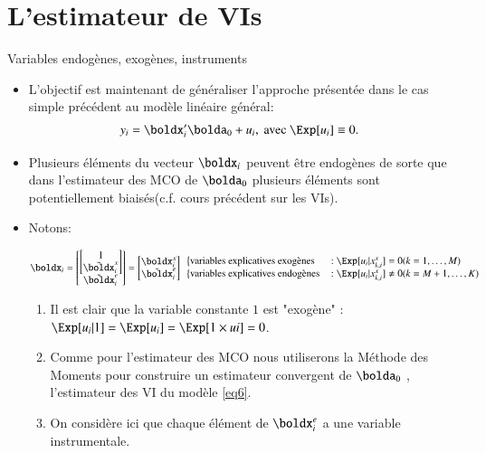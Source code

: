\section{L'estimateur de VIs}
\frame{\sectionpage}
\begin{frame}[allowframebreaks]{Variables endogènes, exogènes, instruments}
\begin{itemize}
    \item L’objectif est maintenant de généraliser l’approche présentée dans
     le cas simple précédent au  modèle linéaire général:
    \begin{align}
        y_i&=\boldx_i^\prime\bolda_0 + u_i, \ \text{avec} \ \Exp[u_i] \equiv 0.
        \label{eq6}
    \end{align}
    \item Plusieurs éléments du vecteur $\boldx_i$ 
    peuvent être endogènes de sorte que dans l'estimateur des MCO de $\bolda_0$ plusieurs
    éléments sont potentiellement biaisés(c.f. cours précédent sur les VIs). 
    \item Notons:

    \[\boldx_i = 
    \begin{bmatrix}
        \begin{bmatrix}
        1\\
        \tilde{\boldx}_i^x
        \end{bmatrix}\\
        \tilde{\boldx}_i^e
    \end{bmatrix} 
    =
    \begin{bmatrix}
        \boldx_i^x\\
        \tilde{\boldx}_i^e
    \end{bmatrix}
    \begin{array}{ll}
        \left\{ \text{variables explicatives exogènes}\right. &: \Exp[u_i|x_{k, i}^x] = 0 (k=1,\ldots,M)\\
        \left\{ \text{variables explicatives endogènes}\right.&: \Exp[u_i|x_{k, i}^x] \neq 0(k=M +1,\ldots,K)
    \end{array}
    \]
    \begin{remark_fr}
    \begin{enumerate}[$\star$]
        \item Il est clair que la variable constante $1$ est "exogène" : $\Exp[u_i|1] 
        =\Exp[u_i] =\Exp[1\times ui] =0$.
        \item Comme pour l'estimateur des MCO nous utiliserons la Méthode des Moments 
        pour construire un estimateur convergent de $\bolda_0$ , l’estimateur des VI 
        du modèle \eqref{eq6}.
        \item On considère ici que chaque élément de $\boldx_i^e$ a une variable instrumentale.
    \end{enumerate}
    \end{remark_fr}


\end{itemize}
\end{frame}
